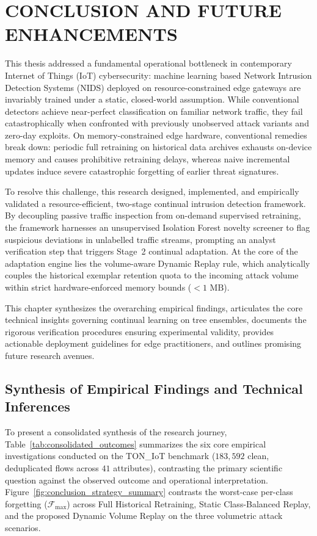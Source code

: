 \chapter{CONCLUSION AND FUTURE ENHANCEMENTS}
\label{chap:conclusion}

This thesis addressed a fundamental operational bottleneck in contemporary Internet of Things (IoT) cybersecurity: machine learning based Network Intrusion Detection Systems (NIDS) deployed on resource-constrained edge gateways are invariably trained under a static, closed-world assumption. While conventional detectors achieve near-perfect classification on familiar network traffic, they fail catastrophically when confronted with previously unobserved attack variants and zero-day exploits. On memory-constrained edge hardware, conventional remedies break down: periodic full retraining on historical data archives exhausts on-device memory and causes prohibitive retraining delays, whereas naive incremental updates induce severe catastrophic forgetting of earlier threat signatures.

To resolve this challenge, this research designed, implemented, and empirically validated a resource-efficient, two-stage continual intrusion detection framework. By decoupling passive traffic inspection from on-demand supervised retraining, the framework harnesses an unsupervised Isolation Forest novelty screener to flag suspicious deviations in unlabelled traffic streams, prompting an analyst verification step that triggers Stage~2 continual adaptation. At the core of the adaptation engine lies the volume-aware Dynamic Replay rule, which analytically couples the historical exemplar retention quota to the incoming attack volume within strict hardware-enforced memory bounds ($< 1\text{ MB}$).

This chapter synthesizes the overarching empirical findings, articulates the core technical insights governing continual learning on tree ensembles, documents the rigorous verification procedures ensuring experimental validity, provides actionable deployment guidelines for edge practitioners, and outlines promising future research avenues.

\section{Synthesis of Empirical Findings and Technical Inferences}
\label{sec:interpretation}

To present a consolidated synthesis of the research journey, Table~\ref{tab:consolidated_outcomes} summarizes the six core empirical investigations conducted on the TON\_IoT benchmark ($183{,}592$ clean, deduplicated flows across $41$ attributes), contrasting the primary scientific question against the observed outcome and operational interpretation. Figure~\ref{fig:conclusion_strategy_summary} contrasts the worst-case per-class forgetting ($\mathcal{F}_{\max}$) across Full Historical Retraining, Static Class-Balanced Replay, and the proposed Dynamic Volume Replay on the three volumetric attack scenarios.

